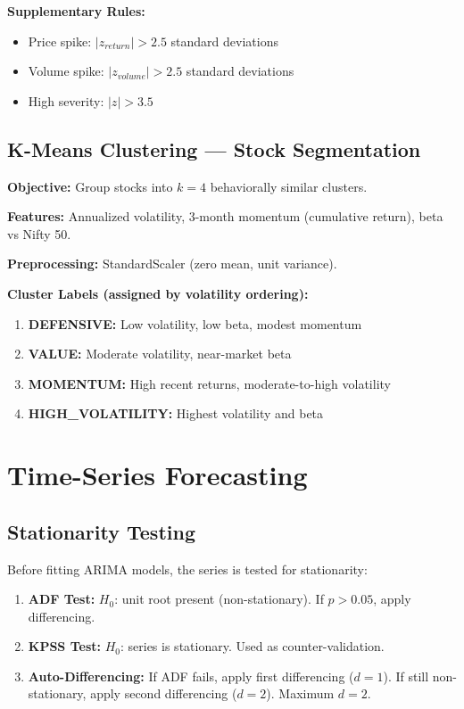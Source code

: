 \documentclass[12pt, a4paper, oneside]{report}
\begin{document}
\textbf{Supplementary Rules:}
\begin{itemize}[nosep]
    \item Price spike: $|z_{return}| > 2.5$ standard deviations
    \item Volume spike: $|z_{volume}| > 2.5$ standard deviations
    \item High severity: $|z| > 3.5$
\end{itemize}

\subsection{K-Means Clustering --- Stock Segmentation}

\textbf{Objective:} Group stocks into $k=4$ behaviorally similar clusters.

\textbf{Features:} Annualized volatility, 3-month momentum (cumulative return), beta vs Nifty 50.

\textbf{Preprocessing:} StandardScaler (zero mean, unit variance).

\textbf{Cluster Labels (assigned by volatility ordering):}
\begin{enumerate}[nosep]
    \item \textbf{DEFENSIVE:} Low volatility, low beta, modest momentum
    \item \textbf{VALUE:} Moderate volatility, near-market beta
    \item \textbf{MOMENTUM:} High recent returns, moderate-to-high volatility
    \item \textbf{HIGH\_VOLATILITY:} Highest volatility and beta
\end{enumerate}

\section{Time-Series Forecasting}
\label{sec:meth_timeseries}

\subsection{Stationarity Testing}

Before fitting ARIMA models, the series is tested for stationarity:

\begin{enumerate}[nosep]
    \item \textbf{ADF Test:} $H_0$: unit root present (non-stationary). If $p > 0.05$, apply differencing.
    \item \textbf{KPSS Test:} $H_0$: series is stationary. Used as counter-validation.
    \item \textbf{Auto-Differencing:} If ADF fails, apply first differencing ($d=1$). If still non-stationary, apply second differencing ($d=2$). Maximum $d=2$.
\end{enumerate}
\end{document}
